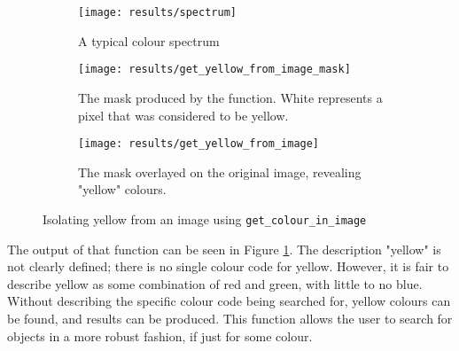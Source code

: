 \documentclass[../main.tex]{subfiles}
\begin{document}
    \begin{figure}[H]
      \centering
      \begin{subfigure}[B]{0.8\textwidth}
        \centering
        \texttt{[image: results/spectrum]}
        \caption{A typical colour spectrum}
      \end{subfigure}

      \begin{subfigure}[B]{0.8\textwidth}
        \centering
        \texttt{[image: results/get\_yellow\_from\_image\_mask]}
        \caption{The mask produced by the function. White represents a pixel that was considered to be yellow.}
      \end{subfigure}

      \begin{subfigure}[B]{0.8\textwidth}
        \centering
        \texttt{[image: results/get\_yellow\_from\_image]}
        \caption{The mask overlayed on the original image, revealing "yellow" colours.}
      \end{subfigure}
      \caption{Isolating yellow from an image using \texttt{get\_colour\_in\_image}}
      \label{findyellow}
    \end{figure}

    The output of that function can be seen in Figure \ref{findyellow}.
    The description "yellow" is not clearly defined; there is no single colour code for yellow.
    However, it is fair to describe yellow as some combination of red and green, with little to no blue.
    Without describing the specific colour code being searched for, yellow colours can be found, and results can be produced.
    This function allows the user to search for objects in a more robust fashion, if just for some colour.
\end{document}

